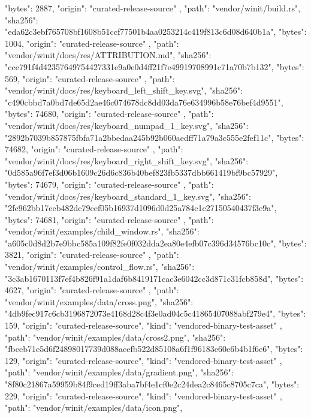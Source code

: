 {{      "bytes": 2887,
      "origin": "curated-release-source"
    },
    {
      "path": "vendor/winit/build.rs",
      "sha256": "eda62c3ebf765708bf1608b51ccf77501b4aa0253214c419f813c6d08d640b1a",
      "bytes": 1004,
      "origin": "curated-release-source"
    },
    {
      "path": "vendor/winit/docs/res/ATTRIBUTION.md",
      "sha256": "cce791f4d42357649754427331e9a0e0d4ff21f7e49919708991c71a70b7b132",
      "bytes": 569,
      "origin": "curated-release-source"
    },
    {
      "path": "vendor/winit/docs/res/keyboard_left_shift_key.svg",
      "sha256": "c490cbbd7a0bd7de65d2ae46c074678dc8dd03da76e634996b58e76bef4d9551",
      "bytes": 74680,
      "origin": "curated-release-source"
    },
    {
      "path": "vendor/winit/docs/res/keyboard_numpad_1_key.svg",
      "sha256": "2892b7039b857875fbfa71a2bbedaa245b92b060aedff71a79a3c555e2fef11c",
      "bytes": 74682,
      "origin": "curated-release-source"
    },
    {
      "path": "vendor/winit/docs/res/keyboard_right_shift_key.svg",
      "sha256": "0d585a96f7ef3d06b1609c26d6c836b40bef823fb5337dbb661419bf9bc57929",
      "bytes": 74679,
      "origin": "curated-release-source"
    },
    {
      "path": "vendor/winit/docs/res/keyboard_standard_1_key.svg",
      "sha256": "2fc962bb17eeb482dc79cef05b16937d1096d0d25a784c1c27150540437f3e9a",
      "bytes": 74681,
      "origin": "curated-release-source"
    },
    {
      "path": "vendor/winit/examples/child_window.rs",
      "sha256": "a605c0d8d2b7e9bbc585a109f82fe0f032dda2ea80e4efb07c396d34576bc10c",
      "bytes": 3821,
      "origin": "curated-release-source"
    },
    {
      "path": "vendor/winit/examples/control_flow.rs",
      "sha256": "3c3ab1670113f7ef4b826f91a1daf6b8419171cac3e6042cc3d871c31fcb858d",
      "bytes": 4627,
      "origin": "curated-release-source"
    },
    {
      "path": "vendor/winit/examples/data/cross.png",
      "sha256": "4db9fec917c6cb3196872073e4168d28c4f3e0ad04c5c41865407088abf279e4",
      "bytes": 159,
      "origin": "curated-release-source",
      "kind": "vendored-binary-test-asset"
    },
    {
      "path": "vendor/winit/examples/data/cross2.png",
      "sha256": "fbeeb71e5d6f24898017739d088acefb522d85108a6f1f96183e60e6b4b1f6e6",
      "bytes": 129,
      "origin": "curated-release-source",
      "kind": "vendored-binary-test-asset"
    },
    {
      "path": "vendor/winit/examples/data/gradient.png",
      "sha256": "8f80c21867a59959b84f9ced19ff3aba7bf4e1cf0e2c24dea2c8465c8705c7ca",
      "bytes": 229,
      "origin": "curated-release-source",
      "kind": "vendored-binary-test-asset"
    },
    {
      "path": "vendor/winit/examples/data/icon.png",
}}
